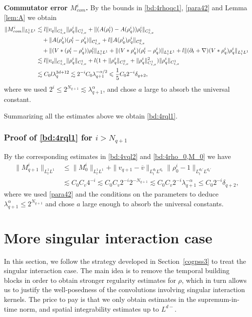 \documentclass[UTF-8,reqno]{amsart}
\numberwithin{equation}{section}
\theoremstyle{definition}
\def\leq{\leqslant}
\def\leq{\leqslant}
\begin{document}
\textbf{Commutator error $M_{com}^i$.} By  the bounds in   \eqref{bd:4rhoqc1}, \eqref{para42} and Lemma \ref{lem:A}  we obtain
 \begin{align}
  \|M_{ com}^i\|_{L_t^1L^1}&\lesssim l\|v_q\|_{C_{t,x}^1}\|\rho_q^i \|_{C_{t,x}^1}+\|(A(\rho_l^i) -A(\rho_q^i)) \rho_l^i\|_{C_{t,x}^1} \notag\\ 
  &\quad+\|A(\rho_q^i)( \rho_l^i- \rho_q^i)\|_{C_{t,x}^1}+l\|A(\rho_q^i) \rho_q^i\|_{C_{t,x}^2}\notag\\
  &\quad +\|(V*(\rho_l^i-\rho_q^i))\rho_l^i\|_{L_{t}^1L^1} +\|(V*\rho_q^i)(\rho_l^i- \rho_q^i)\|_{L_{t}^1L^1} + l\|(\partial_t+\nabla)(V*\rho_q^i)\rho_q^i\|_{L_{t}^1L^1}\notag\\
 & \lesssim l\|v_q\|_{C_{t,x}^1}\|\rho_q^i\|_{C_{t,x}^1}+l (1+  \| \rho_q^i\|_{C_{t,x}^2}+\| \rho_q^i\|_{C_{t,x}^1}^2)\| \rho_q^i\|_{C_{t,x}^1}\notag\\
 &\lesssim C_0 l\lambda_q^{3d+12}\lesssim  2^{-i}C_0  \lambda_{q+1}^{-\alpha/2}\leq \frac{1}{5}C_02^{-i}\delta_{q+2},\label{bd:4mcom}
   \end{align}  
   where we used $2^i\leq2^{N_{q+1}}\lesssim \lambda_{q+1}^\alpha$, and  chose $a$ large to absorb the universal constant.
   
Summarizing all the estimates above  we obtain   \eqref{bd:4rql1}. 


\subsubsection{Proof of  \eqref{bd:4rql1} for $i> N_{q+1}$}\label{sec:estmq+1big}



By the corresponding estimates in  \eqref{bd:4vql2} and \eqref{bd:4rho_0,M_0}  we have
\begin{align*}
    \|M^{i}_{q+1}\|_{L^1_tL^1}&\leq \|M^{i}_{0}\|_{L^1_tL^1}+\|v_{q+1}-\overline v\|_{L^{d_0}_tL^{d_0}}\|\rho^{i}_0-1\|_{L^{d_0'}_tL^{d_0'}}\\
    &\lesssim C_0 C_v 4^{-i}\lesssim C_0 C_v2^{-i}2^{-N_{q+1}}\lesssim C_0 C_v 2^{-i}\lambda_{q+1}^{-\alpha}\leq C_0 2^{-i}\delta_{q+2},
\end{align*}
where we  used \eqref{para42} and the conditions on the parameters  to deduce 
$\lambda_{q+1}^{\alpha}\leq2^{N_{q+1}} $ and chose $a$ large enough to absorb the universal constants.
 





\section{More singular interaction  case}\label{cogpss6} 
In this section, we follow the strategy developed in Section~\ref{cogpss3} to treat the singular interaction case. 
The main idea is to remove the temporal building blocks in order to obtain stronger regularity estimates for $\rho$, which in turn allows us to justify the well-posedness of the convolutions involving singular interaction kernels. The price to pay is that we only obtain estimates in the supremum-in-time norm, and spatial integrability estimates up to $L^{d-}$.
 
\end{document}
